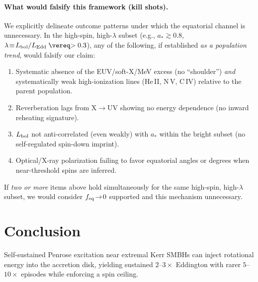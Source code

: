 \documentclass[twocolumn]{aastex701}
\begin{document}

\paragraph{What would falsify this framework (kill shots).}
We explicitly delineate outcome patterns under which the equatorial channel is unnecessary. In the high-spin, high-$\lambda$ subset (e.g., $a_*\gtrsim0.8$, $\lambda\!\equiv\!L_{\rm bol}/L_{\rm Edd}\gtrsim0.3$), any of the following, if established \emph{as a population trend}, would falsify our claim:
\begin{enumerate}
\item Systematic absence of the EUV/soft-X/MeV excess (no ``shoulder'') \emph{and} systematically weak high-ionization lines (He\,II, N\,V, C\,IV) relative to the parent population.
\item Reverberation lags from X$\rightarrow$UV showing no energy dependence (no inward reheating signature).
\item $L_{\rm bol}$ not anti-correlated (even weakly) with $a_*$ within the bright subset (no self-regulated spin-down imprint).
\item Optical/X-ray polarization failing to favor equatorial angles or degrees when near-threshold spins are inferred.
\end{enumerate}
If \emph{two or more} items above hold simultaneously for the same high-spin, high-$\lambda$ subset, we would consider $f_{\rm eq}\!\to\!0$ supported and this mechanism unnecessary.

\section{Conclusion}\label{sec:conclusion}
Self-sustained Penrose excitation near extremal Kerr SMBHs can inject rotational energy into the accretion disk, yielding sustained $2$--$3\times$ Eddington with rarer $5$--$10\times$ episodes while enforcing a spin ceiling.

\clearpage
\appendix
\end{document}
